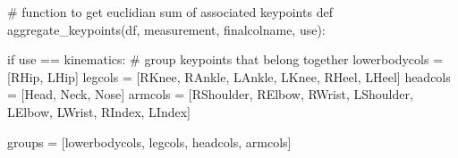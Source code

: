\documentclass[
  letterpaper,
  DIV=11,
  numbers=noendperiod]{scrreprt}
\newenvironment{Shaded}{\begin{snugshade}}{\end{snugshade}}
\newcommand{\CommentTok}[1]{\textcolor[rgb]{0.37,0.37,0.37}{#1}}
\newcommand{\ControlFlowTok}[1]{\textcolor[rgb]{0.00,0.23,0.31}{#1}}
\newcommand{\KeywordTok}[1]{\textcolor[rgb]{0.00,0.23,0.31}{#1}}
\newcommand{\NormalTok}[1]{\textcolor[rgb]{0.00,0.23,0.31}{#1}}
\newcommand{\OperatorTok}[1]{\textcolor[rgb]{0.37,0.37,0.37}{#1}}
\newcommand{\StringTok}[1]{\textcolor[rgb]{0.13,0.47,0.30}{#1}}
\begin{document}
\begin{Shaded}
\begin{Highlighting}[]
\CommentTok{\# function to get euclidian sum of associated keypoints}
\KeywordTok{def}\NormalTok{ aggregate\_keypoints(df, measurement, finalcolname, use):}

    \ControlFlowTok{if}\NormalTok{ use }\OperatorTok{==} \StringTok{\textquotesingle{}kinematics\textquotesingle{}}\NormalTok{:}
        \CommentTok{\# group keypoints that belong together}
\NormalTok{        lowerbodycols }\OperatorTok{=}\NormalTok{ [}\StringTok{\textquotesingle{}RHip\textquotesingle{}}\NormalTok{, }\StringTok{\textquotesingle{}LHip\textquotesingle{}}\NormalTok{]}
\NormalTok{        legcols }\OperatorTok{=}\NormalTok{ [}\StringTok{\textquotesingle{}RKnee\textquotesingle{}}\NormalTok{, }\StringTok{\textquotesingle{}RAnkle\textquotesingle{}}\NormalTok{, }\StringTok{\textquotesingle{}LAnkle\textquotesingle{}}\NormalTok{, }\StringTok{\textquotesingle{}LKnee\textquotesingle{}}\NormalTok{, }\StringTok{\textquotesingle{}RHeel\textquotesingle{}}\NormalTok{, }\StringTok{\textquotesingle{}LHeel\textquotesingle{}}\NormalTok{]}
\NormalTok{        headcols }\OperatorTok{=}\NormalTok{ [}\StringTok{\textquotesingle{}Head\textquotesingle{}}\NormalTok{, }\StringTok{\textquotesingle{}Neck\textquotesingle{}}\NormalTok{, }\StringTok{\textquotesingle{}Nose\textquotesingle{}}\NormalTok{]}
\NormalTok{        armcols }\OperatorTok{=}\NormalTok{ [}\StringTok{\textquotesingle{}RShoulder\textquotesingle{}}\NormalTok{, }\StringTok{\textquotesingle{}RElbow\textquotesingle{}}\NormalTok{, }\StringTok{\textquotesingle{}RWrist\textquotesingle{}}\NormalTok{, }\StringTok{\textquotesingle{}LShoulder\textquotesingle{}}\NormalTok{, }\StringTok{\textquotesingle{}LElbow\textquotesingle{}}\NormalTok{, }\StringTok{\textquotesingle{}LWrist\textquotesingle{}}\NormalTok{, }\StringTok{\textquotesingle{}RIndex\textquotesingle{}}\NormalTok{, }\StringTok{\textquotesingle{}LIndex\textquotesingle{}}\NormalTok{]}

\NormalTok{        groups }\OperatorTok{=}\NormalTok{ [lowerbodycols, legcols, headcols, armcols]}


\end{Highlighting}
\end{Shaded}
\end{document}
